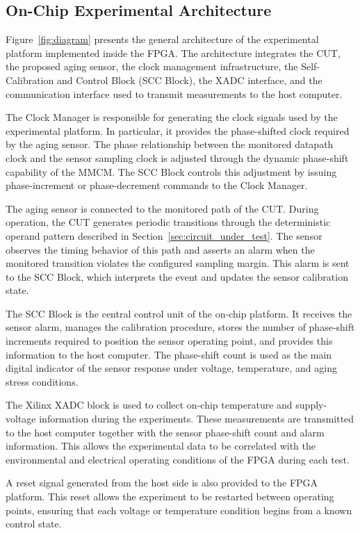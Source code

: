 \documentclass[a4paper,10pt,twoside,twocolumn,final]{JICS_LaTexGuidelines}
\begin{document}
\subsection{On-Chip Experimental Architecture} \label{sec:onchip_experimental_architecture}

Figure~\ref{fig:diagram} presents the general architecture of the experimental platform implemented inside the FPGA. The architecture integrates the CUT, the proposed aging sensor, the clock management infrastructure, the Self-Calibration and Control Block (SCC Block), the XADC interface, and the communication interface used to transmit measurements to the host computer.

The Clock Manager is responsible for generating the clock signals used by the experimental platform. In particular, it provides the phase-shifted clock required by the aging sensor. The phase relationship between the monitored datapath clock and the sensor sampling clock is adjusted through the dynamic phase-shift capability of the MMCM. The SCC Block controls this adjustment by issuing phase-increment or phase-decrement commands to the Clock Manager.

The aging sensor is connected to the monitored path of the CUT. During operation, the CUT generates periodic transitions through the deterministic operand pattern described in Section~\ref{sec:circuit_under_test}. The sensor observes the timing behavior of this path and asserts an alarm when the monitored transition violates the configured sampling margin. This alarm is sent to the SCC Block, which interprets the event and updates the sensor calibration state.

The SCC Block is the central control unit of the on-chip platform. It receives the sensor alarm, manages the calibration procedure, stores the number of phase-shift increments required to position the sensor operating point, and provides this information to the host computer. The phase-shift count is used as the main digital indicator of the sensor response under voltage, temperature, and aging stress conditions.

The Xilinx XADC block is used to collect on-chip temperature and supply-voltage information during the experiments. These measurements are transmitted to the host computer together with the sensor phase-shift count and alarm information. This allows the experimental data to be correlated with the environmental and electrical operating conditions of the FPGA during each test.

A reset signal generated from the host side is also provided to the FPGA platform. This reset allows the experiment to be restarted between operating points, ensuring that each voltage or temperature condition begins from a known control state.
\end{document}

